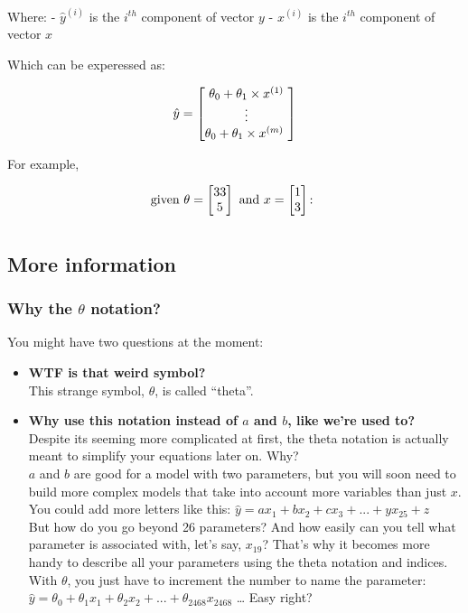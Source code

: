 \documentclass[]{article}
\begin{document}
Where: - \(\hat{y}^{(i)}\) is the \(i^{th}\) component of vector \(y\) -
\(x^{(i)}\) is the \(i^{th}\) component of vector \(x\)

Which can be experessed as:

\[
\normalsize
\hat{y} = \begin{bmatrix}\theta_0 + \theta_1 \times x^{(1)} \\ \vdots \\  \theta_0 + \theta_1 \times x^{(m)}\ \end{bmatrix}
\large
\]

For example,

\[
\normalsize
\text{given } \theta = \begin{bmatrix}33 \\ 5 \end{bmatrix} \text{ and } x = \begin{bmatrix}1 \\ 3 \end{bmatrix} \text{: }\]
\large \[
\] \normalsize

\hypertarget{more-information}{%
\subsection{More information}\label{more-information}}

\hypertarget{why-the-theta-notation}{%
\subsubsection{\texorpdfstring{Why the \(\theta\)
notation?}{Why the \textbackslash{}theta notation?}}\label{why-the-theta-notation}}

You might have two questions at the moment:

\begin{itemize}
\item
  \textbf{WTF is that weird symbol?}\\
  This strange symbol, \(\theta\), is called ``theta''.
\item
  \textbf{Why use this notation instead of \(a\) and \(b\), like we're
  used to?}\\
  Despite its seeming more complicated at first, the theta notation is
  actually meant to simplify your equations later on. Why?\\
  \(a\) and \(b\) are good for a model with two parameters, but you will
  soon need to build more complex models that take into account more
  variables than just \(x\).\\
  You could add more letters like this:
  \(\hat{y} = ax_1 + bx_2 + cx_3 + ... + yx_{25} + z\)\\
  But how do you go beyond 26 parameters? And how easily can you tell
  what parameter is associated with, let's say, \(x_{19}\)? That's why
  it becomes more handy to describe all your parameters using the theta
  notation and indices. With \(\theta\), you just have to increment the
  number to name the parameter:\\
  \(\hat{y} = \theta_0 + \theta_1 x_1 + \theta_2 x_2 + ... + \theta_{2468} x_{2468}\)
  \ldots{} Easy right?
\end{itemize}
\end{document}
